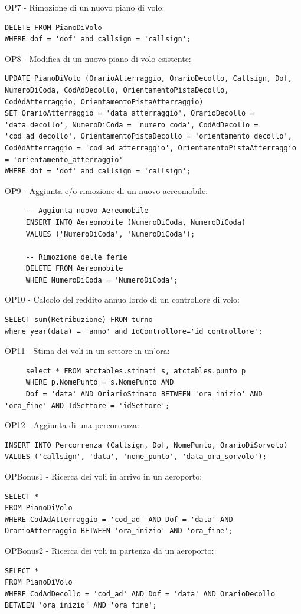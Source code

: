 OP7 - Rimozione di un nuovo piano di volo:
\begin{lstlisting}
DELETE FROM PianoDiVolo
WHERE dof = 'dof' and callsign = 'callsign';
\end{lstlisting}

OP8 - Modifica di un nuovo piano di volo esistente:
\begin{lstlisting}
UPDATE PianoDiVolo (OrarioAtterraggio, OrarioDecollo, Callsign, Dof, NumeroDiCoda, CodAdDecollo, OrientamentoPistaDecollo, CodAdAtterraggio, OrientamentoPistaAtterraggio)
SET OrarioAtterraggio = 'data_atterraggio', OrarioDecollo = 'data_decollo', NumeroDiCoda = 'numero_coda', CodAdDecollo = 'cod_ad_decollo', OrientamentoPistaDecollo = 'orientamento_decollo', CodAdAtterraggio = 'cod_ad_atterraggio', OrientamentoPistaAtterraggio = 'orientamento_atterraggio'
WHERE dof = 'dof' and callsign = 'callsign';

\end{lstlisting}

OP9 - Aggiunta e/o rimozione di un nuovo aereomobile:
\begin{lstlisting}
     -- Aggiunta nuovo Aereomobile
     INSERT INTO Aereomobile (NumeroDiCoda, NumeroDiCoda)
     VALUES ('NumeroDiCoda', 'NumeroDiCoda');
     
     -- Rimozione delle ferie
     DELETE FROM Aereomobile
     WHERE NumeroDiCoda = 'NumeroDiCoda';
     \end{lstlisting}

OP10 - Calcolo del reddito annuo lordo di un controllore di volo:
\begin{lstlisting}
SELECT sum(Retribuzione) FROM turno
where year(data) = 'anno' and IdControllore='id controllore';
\end{lstlisting}

OP11 - Stima dei voli in un settore in un'ora:
\begin{lstlisting}
     select * FROM atctables.stimati s, atctables.punto p
     WHERE p.NomePunto = s.NomePunto AND
     Dof = 'data' AND OriarioStimato BETWEEN 'ora_inizio' AND 'ora_fine' AND IdSettore = 'idSettore';
\end{lstlisting}

OP12 - Aggiunta di una percorrenza:
\begin{lstlisting}
INSERT INTO Percorrenza (Callsign, Dof, NomePunto, OrarioDiSorvolo)
VALUES ('callsign', 'data', 'nome_punto', 'data_ora_sorvolo');
\end{lstlisting}


OPBonus1 - Ricerca dei voli in arrivo in un aeroporto:
\begin{lstlisting}
SELECT *
FROM PianoDiVolo
WHERE CodAdAtterraggio = 'cod_ad' AND Dof = 'data' AND OrarioAtterraggio BETWEEN 'ora_inizio' AND 'ora_fine';
\end{lstlisting}

OPBonus2 - Ricerca dei voli in partenza da un aeroporto:
\begin{lstlisting}
SELECT *
FROM PianoDiVolo
WHERE CodAdDecollo = 'cod_ad' AND Dof = 'data' AND OrarioDecollo BETWEEN 'ora_inizio' AND 'ora_fine';
\end{lstlisting}
